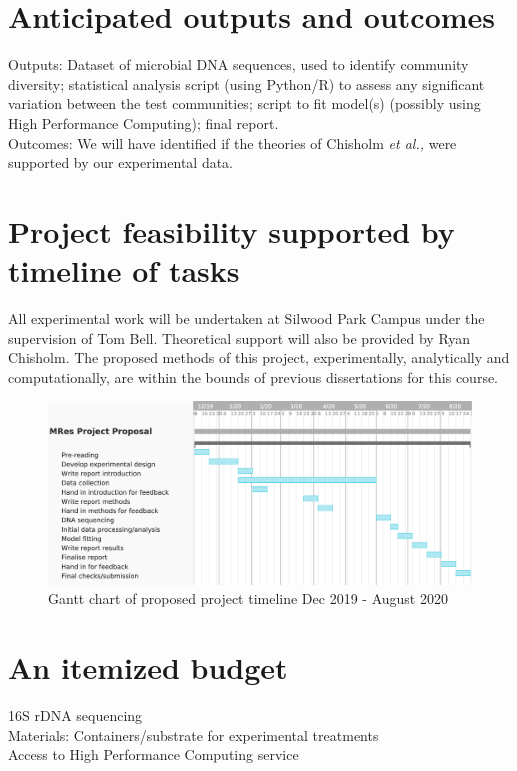 \documentclass[11pt]{article}
\begin{document}
  \section{Anticipated outputs and outcomes}
  Outputs: Dataset of microbial DNA sequences, used to identify community diversity; statistical analysis script (using Python/R) to assess any significant variation between the test communities; script to fit model(s) (possibly using High Performance Computing); final report. \\
Outcomes: We will have identified if the theories of Chisholm \textit{et al.,} were supported by our experimental data.

\section{Project feasibility supported by timeline of tasks}
All experimental work will be undertaken at Silwood Park Campus under the supervision of Tom Bell. Theoretical support will also be provided by Ryan Chisholm. The proposed methods of this project, experimentally, analytically and computationally, are within the bounds of previous dissertations for this course. 
\begin{figure}[h!] 
	\includegraphics[width=\linewidth]{gantt_chart.png}
	\caption{Gantt chart of proposed project timeline Dec 2019 - August 2020} 
\end{figure}

\section{An itemized budget}
16S rDNA sequencing \\
Materials: Containers/substrate for experimental treatments \\
Access to High Performance Computing service 

  
  
\end{document}

